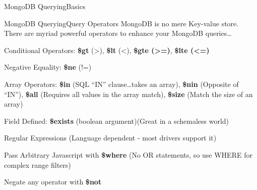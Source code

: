 \documentclass{beamer}
\begin{document}
\begin{frame}{MongoDB Querying}{Basics}
\end{frame}

\begin{frame}{MongoDB Querying}{Query Operators}
     MongoDB is no mere Key-value store. There are myriad powerful operators to enhance your MongoDB queries\ldots
    \begin{itemize}{\small
        \item Conditional Operators: {\bf \$gt} (>), {\bf \$lt} (<), {\bf \$gte (>=)},  {\bf \$lte (<=)}
        \item Negative Equality: {\bf \$ne} (!=) 
        \item Array Operators: {\bf \$in} (SQL ``IN'' clause\ldots takes an array), {\bf \$nin} (Opposite of ``IN''), {\bf \$all} (Requires all values in the array match), {\bf \$size} (Match the size of an array)
        \item Field Defined: {\bf \$exists} (boolean argument)(Great in a schemaless world)
        \item Regular Expressions (Language dependent - most drivers support it)
        \item Pass Arbitrary Javascript with {\bf \$where} (No OR statements, so use WHERE for complex range filters)
        \item Negate any operator with {\bf \$not}
        }
    \end{itemize}
\end{frame}
\end{document}
